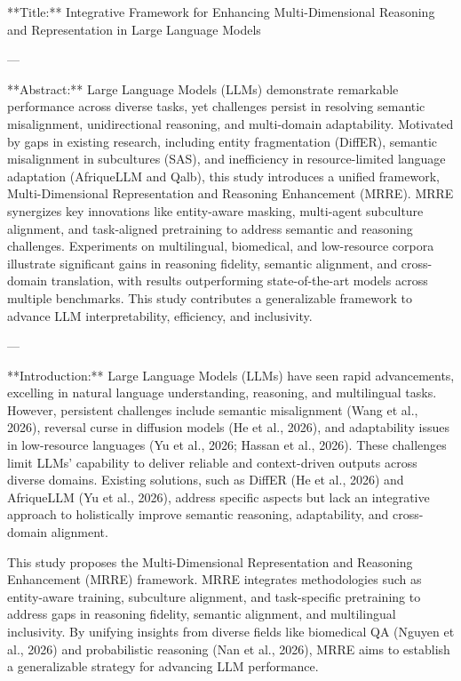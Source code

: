 **Title:** Integrative Framework for Enhancing Multi-Dimensional Reasoning and Representation in Large Language Models  

---

**Abstract:**  
Large Language Models (LLMs) demonstrate remarkable performance across diverse tasks, yet challenges persist in resolving semantic misalignment, unidirectional reasoning, and multi-domain adaptability. Motivated by gaps in existing research, including entity fragmentation (DiffER), semantic misalignment in subcultures (SAS), and inefficiency in resource-limited language adaptation (AfriqueLLM and Qalb), this study introduces a unified framework, Multi-Dimensional Representation and Reasoning Enhancement (MRRE). MRRE synergizes key innovations like entity-aware masking, multi-agent subculture alignment, and task-aligned pretraining to address semantic and reasoning challenges. Experiments on multilingual, biomedical, and low-resource corpora illustrate significant gains in reasoning fidelity, semantic alignment, and cross-domain translation, with results outperforming state-of-the-art models across multiple benchmarks. This study contributes a generalizable framework to advance LLM interpretability, efficiency, and inclusivity.

---

**Introduction:**  
Large Language Models (LLMs) have seen rapid advancements, excelling in natural language understanding, reasoning, and multilingual tasks. However, persistent challenges include semantic misalignment (Wang et al., 2026), reversal curse in diffusion models (He et al., 2026), and adaptability issues in low-resource languages (Yu et al., 2026; Hassan et al., 2026). These challenges limit LLMs' capability to deliver reliable and context-driven outputs across diverse domains. Existing solutions, such as DiffER (He et al., 2026) and AfriqueLLM (Yu et al., 2026), address specific aspects but lack an integrative approach to holistically improve semantic reasoning, adaptability, and cross-domain alignment.  

This study proposes the Multi-Dimensional Representation and Reasoning Enhancement (MRRE) framework. MRRE integrates methodologies such as entity-aware training, subculture alignment, and task-specific pretraining to address gaps in reasoning fidelity, semantic alignment, and multilingual inclusivity. By unifying insights from diverse fields like biomedical QA (Nguyen et al., 2026) and probabilistic reasoning (Nan et al., 2026), MRRE aims to establish a generalizable strategy for advancing LLM performance.

